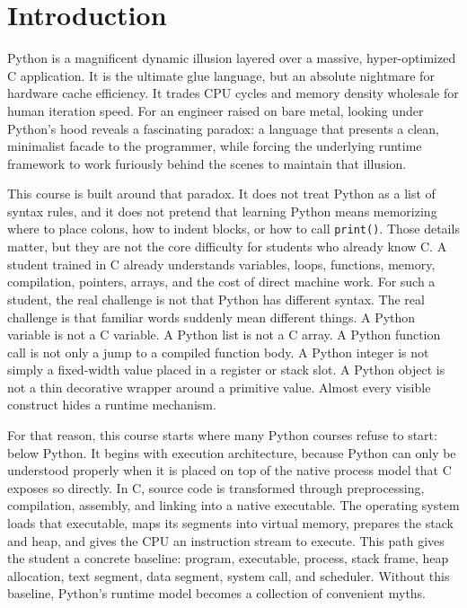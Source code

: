 \chapter{Introduction}

Python is a magnificent dynamic illusion layered over a massive, hyper-optimized C application. It is the ultimate glue language, but an absolute nightmare for hardware cache efficiency. It trades CPU cycles and memory density wholesale for human iteration speed. For an engineer raised on bare metal, looking under Python's hood reveals a fascinating paradox: a language that presents a clean, minimalist facade to the programmer, while forcing the underlying runtime framework to work furiously behind the scenes to maintain that illusion.

This course is built around that paradox. It does not treat Python as a list of syntax rules, and it does not pretend that learning Python means memorizing where to place colons, how to indent blocks, or how to call \texttt{print()}. Those details matter, but they are not the core difficulty for students who already know C. A student trained in C already understands variables, loops, functions, memory, compilation, pointers, arrays, and the cost of direct machine work. For such a student, the real challenge is not that Python has different syntax. The real challenge is that familiar words suddenly mean different things. A Python variable is not a C variable. A Python list is not a C array. A Python function call is not only a jump to a compiled function body. A Python integer is not simply a fixed-width value placed in a register or stack slot. A Python object is not a thin decorative wrapper around a primitive value. Almost every visible construct hides a runtime mechanism.

For that reason, this course starts where many Python courses refuse to start: below Python. It begins with execution architecture, because Python can only be understood properly when it is placed on top of the native process model that C exposes so directly. In C, source code is transformed through preprocessing, compilation, assembly, and linking into a native executable. The operating system loads that executable, maps its segments into virtual memory, prepares the stack and heap, and gives the CPU an instruction stream to execute. This path gives the student a concrete baseline: program, executable, process, stack frame, heap allocation, text segment, data segment, system call, and scheduler. Without this baseline, Python’s runtime model becomes a collection of convenient myths.

